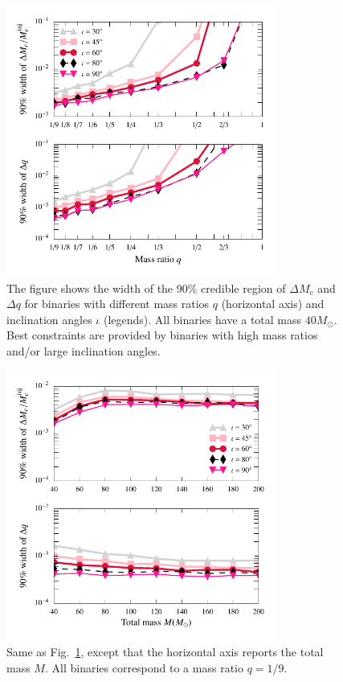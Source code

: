 \documentclass[prl,preprintnumbers,twocolumn,eqsecnum,floatfix,a4paper,nofootinbib,superscriptaddress]{revtex4}
\begin{document}
\begin{figure}[tbh]
	\includegraphics*[width=3.5in]{figs/fig3a_9dim_dmcbymcinj_dq_abhi_q_leq_1.pdf}
	\caption{The figure shows the width of the 90$\%$ credible region of $\Delta M_c$ and $\Delta q$ for binaries with different mass ratios $q$ (horizontal axis) and inclination angles $\iota$ (legends). All binaries have a total mass $40M_{\odot}$. Best constraints are provided by binaries with high mass ratios and/or large inclination angles.}
	\label{fig:dMc_dq_posteriors_gr_vs_q}
\end{figure}

\begin{figure}[tbh]
	\includegraphics*[width=3.5in]{figs/fig3b_9dim_dmcbymcinj_dq_abhi.pdf}
	\caption{Same as Fig.~\ref{fig:dMc_dq_posteriors_gr_vs_q}, except that the horizontal axis reports the total mass $M$. All binaries correspond to a mass ratio $q = 1/9$.}
	\label{fig:dMc_dq_posteriors_gr_vs_M}
\end{figure}
\end{document}
